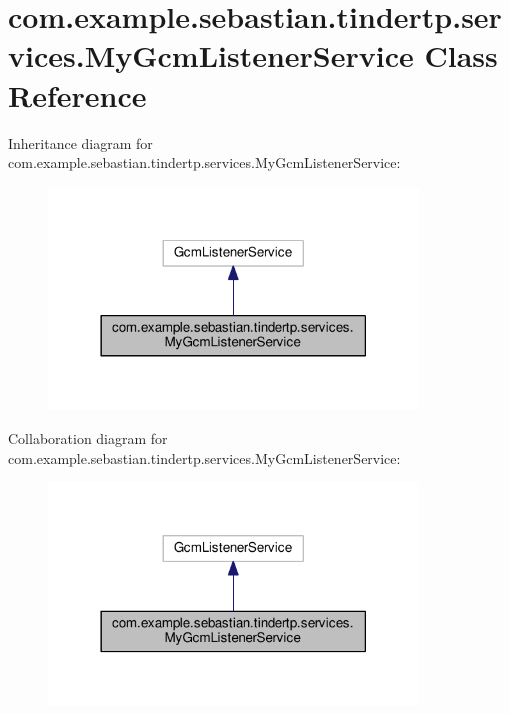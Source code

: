\hypertarget{classcom_1_1example_1_1sebastian_1_1tindertp_1_1services_1_1MyGcmListenerService}{}\section{com.\+example.\+sebastian.\+tindertp.\+services.\+My\+Gcm\+Listener\+Service Class Reference}
\label{classcom_1_1example_1_1sebastian_1_1tindertp_1_1services_1_1MyGcmListenerService}


Inheritance diagram for com.\+example.\+sebastian.\+tindertp.\+services.\+My\+Gcm\+Listener\+Service\+:\nopagebreak
\begin{figure}[H]
\begin{center}
\leavevmode
\includegraphics[width=278pt]{classcom_1_1example_1_1sebastian_1_1tindertp_1_1services_1_1MyGcmListenerService__inherit__graph}
\end{center}
\end{figure}


Collaboration diagram for com.\+example.\+sebastian.\+tindertp.\+services.\+My\+Gcm\+Listener\+Service\+:\nopagebreak
\begin{figure}[H]
\begin{center}
\leavevmode
\includegraphics[width=278pt]{classcom_1_1example_1_1sebastian_1_1tindertp_1_1services_1_1MyGcmListenerService__coll__graph}
\end{center}
\end{figure}

